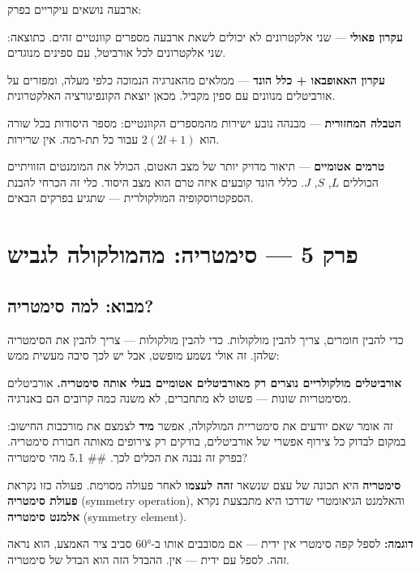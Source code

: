 \documentclass[
  hebrew,
  letterpaper,
  DIV=11,
  numbers=noendperiod]{scrreprt}
\begin{document}
ארבעה נושאים עיקריים בפרק:

\textbf{עקרון פאולי} --- שני אלקטרונים לא יכולים לשאת ארבעה מספרים
קוונטיים זהים. כתוצאה: שני אלקטרונים לכל אורביטל, עם ספינים מנוגדים.

\textbf{עקרון האאופבאו + כלל הונד} --- ממלאים מהאנרגיה הנמוכה כלפי מעלה,
ומפזרים על אורביטלים מנוונים עם ספין מקביל. מכאן יוצאת הקונפיגורציה
האלקטרונית.

\textbf{הטבלה המחזורית} --- מבנהה נובע ישירות מהמספרים הקוונטיים: מספר
היסודות בכל שורה הוא \(2(2l+1)\) עבור כל תת-רמה. אין שרירות.

\textbf{טרמים אטומיים} --- תיאור מדויק יותר של מצב האטום, הכולל את
המומנטים הזוויתיים הכוללים \(L\), \(S\), \(J\). כללי הונד קובעים איזה
טרם הוא מצב היסוד. כלי זה הכרחי להבנת הספקטרוסקופיה המולקולרית --- שתגיע
בפרקים הבאים.


\chapter{פרק 5 --- סימטריה: מהמולקולה
לגביש}\label{ux5e4ux5e8ux5e7-5-ux5e1ux5d9ux5deux5d8ux5e8ux5d9ux5d4-ux5deux5d4ux5deux5d5ux5dcux5e7ux5d5ux5dcux5d4-ux5dcux5d2ux5d1ux5d9ux5e9}

\section{מבוא: למה
סימטריה?}\label{ux5deux5d1ux5d5ux5d0-ux5dcux5deux5d4-ux5e1ux5d9ux5deux5d8ux5e8ux5d9ux5d4}

כדי להבין חומרים, צריך להבין מולקולות. כדי להבין מולקולות --- צריך להבין
את הסימטריה שלהן. זה אולי נשמע מופשט, אבל יש לכך סיבה מעשית ממש:

\textbf{אורביטלים מולקולריים נוצרים רק מאורביטלים אטומיים בעלי אותה
סימטריה.} אורביטלים מסימטריות שונות --- פשוט לא מתחברים, לא משנה כמה
קרובים הם באנרגיה.

זה אומר שאם יודעים את סימטריית המולקולה, אפשר \textbf{מיד} לצמצם את
מורכבות החישוב: במקום לבדוק כל צירוף אפשרי של אורביטלים, בודקים רק
צירופים מאותה חבורת סימטריה. בפרק זה נבנה את הכלים לכך. \#\# 5.1 מהי
סימטריה?

\textbf{סימטריה} היא תכונה של עצם שנשאר \textbf{זהה לעצמו} לאחר פעולה
מסוימת. פעולה כזו נקראת \textbf{פעולת סימטריה} (symmetry operation),
והאלמנט הגיאומטרי שדרכו היא מתבצעת נקרא \textbf{אלמנט סימטריה} (symmetry
element).

\textbf{דוגמה:} לספל קפה סימטרי אין ידית --- אם מסובבים אותו ב-60° סביב
ציר האמצע, הוא נראה זהה. לספל עם ידית --- אין. ההבדל הזה הוא הבדל של
סימטריה.
\end{document}
